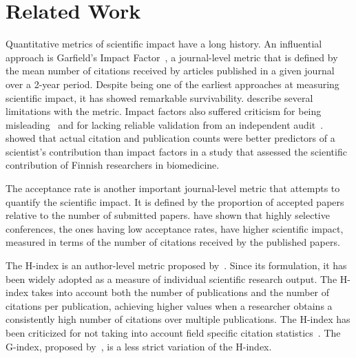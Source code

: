 \documentclass[man]{apa6}
\let \citeA \textcite
\let \cite \parencite
\begin{document}
\section{Related Work}\label{sec:related-work}

Quantitative metrics of scientific impact have a long history. An influential approach is
Garfield's Impact Factor~\cite{Garfield1955a}, a journal-level metric that is defined
by the mean number of citations received by articles published in a given journal over a 2-year period. 
Despite being one of the earliest approaches at measuring scientific impact, it has showed remarkable 
survivability. 
\citeA{Pinski1976} describe several limitations with the metric. Impact factors also suffered 
criticism for being misleading~\cite{Nature2016, Saha2003} and for lacking reliable validation from an independent 
audit~\cite{Rossner2007}. \citeA{Riikonen2008} showed that actual citation 
and publication counts were better predictors of a scientist's contribution than impact factors in a 
study that assessed the scientific contribution of Finnish researchers in biomedicine.

The acceptance rate is another important journal-level metric that attempts to quantify the scientific impact. It
is defined by the proportion of accepted papers relative to the number of submitted papers. \citeA{Chen2010} 
have shown that highly selective conferences, the ones having low acceptance rates, have higher 
scientific impact, measured in terms of the number of citations received by the published papers.

The H-index is an author-level metric proposed by~\citeA{Hirsch2005}. Since its formulation, it has been 
widely adopted as a measure of individual scientific research output.
The H-index takes into account both the number of publications and the number of citations per publication, 
achieving higher values when a researcher obtains a consistently high number of citations over multiple publications. 
The H-index has been criticized for not taking into account field specific citation
statistics~\cite{Wendl2007}. The G-index, proposed by~\citeA{Egghe2006}, is a less strict variation 
of the H-index.
\end{document}
